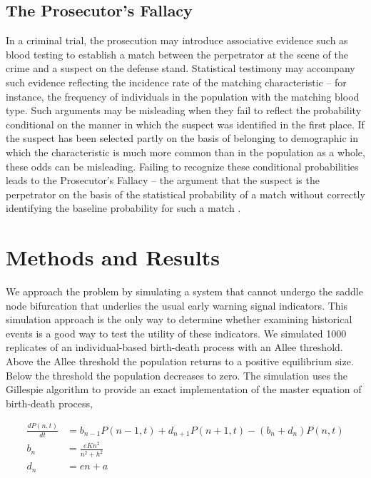 \documentclass[authoryear,review,12pt]{elsarticle}
\begin{document}
\subsection*{The Prosecutor's Fallacy}


In a criminal trial, the prosecution may introduce associative evidence such as 
blood testing to establish a match between the perpetrator at the scene of the
crime and a suspect on the defense stand.  Statistical testimony may accompany 
such evidence reflecting the incidence rate of the matching characteristic -- 
for instance, the frequency of individuals in the population with the matching
blood type.  Such arguments may be misleading when they fail to reflect the 
probability conditional on the manner in which the suspect was identified in 
the first place.  If the suspect has been selected partly on the basis of 
belonging to demographic in which the characteristic is much more common than
in the population as a whole, these odds can be misleading.  Failing to recognize 
these conditional probabilities leads to the Prosecutor's Fallacy -- the 
argument that the suspect is the perpetrator on the basis of the statistical 
probability of a match without correctly identifying the baseline probability 
for such a match \citep{Thompson1987}.


\section{Methods and Results}
We approach the problem by simulating a system that cannot undergo the saddle
node bifurcation that underlies the usual early warning signal indicators.  
This simulation approach is the only way to determine whether examining 
historical events is a good way to test the utility of these indicators.
We simulated 1000 replicates of an individual-based birth-death process
with an Allee threshold.  Above the Allee threshold the population returns
to a positive equilibrium size.  Below the threshold the population decreases
to zero. The simulation uses the Gillespie algorithm to provide an exact 
implementation of the master equation of birth-death process,

\begin{align}
  \frac{dP(n,t)}{dt} &= b_{n-1} P(n-1,t) + d_{n+1}P(n+1,t) - (b_n+d_n) P(n,t)  \label{master} \\
    b_n &= \frac{e K n^2}{n^2 + h^2} \\
    d_n &= e n + a
\end{align}
\end{document}
